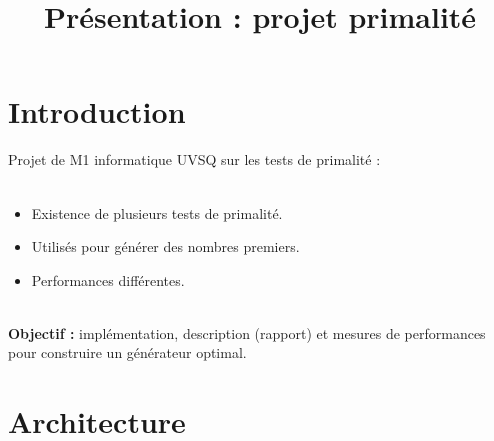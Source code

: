 
\usepackage[french,frenchkw,ruled,vlined]{../texLib/algorithm2e}
\usepackage{../texLib/myInfolines}
\usepackage{longtable,array}
\title{Présentation : projet primalité}




	\begin{frame}
		\titlepage
	\end{frame}
	\section*{Introduction}
	
		\begin{frame}
			Projet de M1 informatique UVSQ sur les tests de primalité :\\~\\
			\begin{itemize}
				\item Existence de plusieurs tests de primalité.
				\item Utilisés pour générer des nombres premiers.
				\item Performances différentes.
			\end{itemize}~\\
			\pause
			\textbf{Objectif :} implémentation, description (rapport) et mesures de performances pour construire un générateur optimal.\\
		\end{frame}
	
		\begin{frame}
			\tableofcontents
		\end{frame}
		
	\section{Architecture}
	

